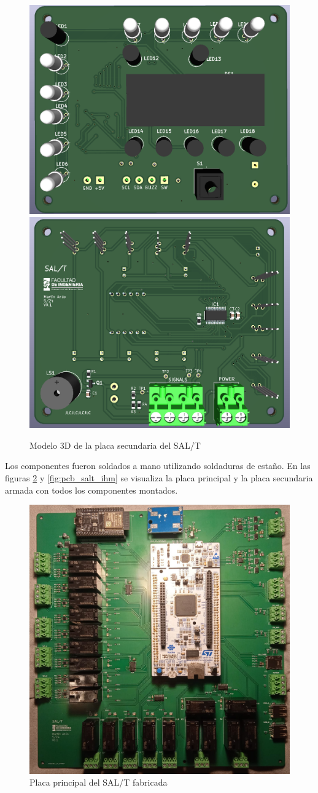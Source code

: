 \begin{figure}[H]
    \centering
    \includegraphics[width = 0.49\linewidth]{img/pcb_ihm_3d.png}
    \includegraphics[width = 0.49\linewidth]{img/pcb_ihm_back_3d.png}
    \caption{Modelo 3D de la placa secundaria del SAL/T}
    \label{fig:salt_ihm_3d}
\end{figure}    




Los componentes fueron soldados a mano utilizando soldaduras de estaño. En las figuras \ref{fig:pcb_salt} y \ref{fig:pcb_salt_ihm} se visualiza la placa principal y la placa secundaria armada con todos los componentes montados. 

\begin{figure}[H]
    \centering
    \includegraphics[width = \linewidth]{img/salt-placa_principal.jpeg}
    \caption{Placa principal del SAL/T fabricada}
    \label{fig:pcb_salt}
\end{figure}    



